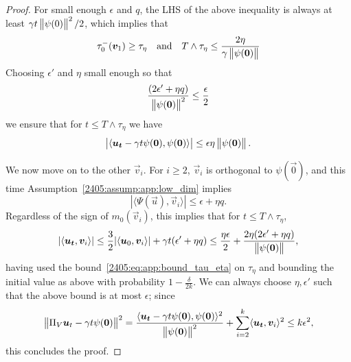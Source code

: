 \begin{proof}
  For small enough $\epsilon$ and $q$, the LHS of the above inequality is always at least $\gamma t \left\lVert \psi(0)\right\rVert^2 / 2$, which implies that
  \begin{equation}\label{2405:eq:app:bound_tau_eta}
    \tau_0^-({\boldsymbol{v}}_1) \geq \tau_\eta \quad \text{and} \quad T \wedge \tau_\eta \leq \frac{2 \eta}{\gamma \left\lVert \psi({\boldsymbol{0}})\right\rVert}
  \end{equation}
  Choosing $\epsilon'$ and $\eta$ small enough so that
  \[ \frac{(2\epsilon' + \eta q)}{\left\lVert \psi({\boldsymbol{0}})\right\rVert^2} \leq \frac{\epsilon}{2}\]
  we ensure that for $t \leq T \wedge \tau_\eta$ we have
  \begin{equation}
    \left| \langle {\boldsymbol{u_t}} - \gamma t \psi({\boldsymbol{0}}), \psi({\boldsymbol{0}}) \rangle \right| \leq \epsilon \eta \left\lVert \psi({\boldsymbol{0}})\right\rVert.
  \end{equation}

  We now move on to the other $\vec{v}_i$. For $i \geq 2$, $\vec{v}_i$ is orthogonal to $\psi(\vec{0})$, and this time Assumption~\ref{2405:assump:app:low_dim} implies
  \[ \left| \langle \Psi(\vec{u}), \vec{v}_i \rangle \right| \leq \epsilon + \eta q. \]
  Regardless of the sign of $m_0(\vec{v}_i)$, this implies that for $t \leq T \wedge \tau_\eta$,
  \[ |\langle {\boldsymbol{u_t}}, {\boldsymbol{v}}_i \rangle| \leq \frac32|\langle {\boldsymbol{u}}_0, {\boldsymbol{v}}_i \rangle| + \gamma t (\epsilon' + \eta q) \leq \frac{\eta\epsilon}{2} + \frac{2\eta(2\epsilon' + \eta q)}{\left\lVert \psi({\boldsymbol{0}})\right\rVert}, \]
  having used the bound~\eqref{2405:eq:app:bound_tau_eta} on $\tau_\eta$ and bounding the initial value as above with probability $1- \frac\delta{2k}$. We can always choose $\eta, \epsilon'$ such that the above bound is at most $\epsilon$; since
  \[ \left\lVert \Pi_V {\boldsymbol{u}}_t - \gamma t \psi({\boldsymbol{0}})\right\rVert^2 = \frac{\langle {\boldsymbol{u_t}} - \gamma t \psi({\boldsymbol{0}}), \psi({\boldsymbol{0}}) \rangle^2}{\left\lVert \psi({\boldsymbol{0}})\right\rVert^2} + \sum_{i=2}^k \langle {\boldsymbol{u_t}}, {\boldsymbol{v}}_i \rangle^2 \leq k\epsilon^2, \]
  this concludes the proof.
\end{proof}

